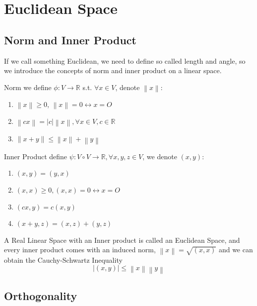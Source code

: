 \chapter{Euclidean Space}
\section{Norm and Inner Product}
If we call something Euclidean, we need to define so called length and angle, so we introduce the concepts of norm and inner product on a linear space.
\begin{definition}{Norm}
  we define $\phi:V \to \mathbb{R}$ s.t. $\forall x \in V$, denote $\left\| x \right\|$:
  \begin{enumerate}
    \item $\left\| x \right\| \geq 0$, $\left\| x \right\| = 0 \leftrightarrow x = O$ 
    \item $\left\| c x \right\| = |c|\left\| x \right\|,\forall x \in V, c \in \mathbb{R}$
    \item $\left\| x + y\right\| \leq \left\| x \right\| + \left\| y \right\|$
  \end{enumerate}
\end{definition}
\begin{definition}{Inner Product}
  define $\psi :V \circ V\to \mathbb{R}, \forall x, y,z \in V$, we denote $(x,y)$:
  \begin{enumerate}
    \item $(x,y)=(y,x)$
    \item $(x,x) \geq 0, (x,x) = 0 \leftrightarrow x = O$
    \item $(cx,y) = c(x,y)$
    \item $(x +y,z) = (x,z)+(y,z)$
  \end{enumerate}
\end{definition}
A Real Linear Space with an Inner product is called an Euclidean Space, and every inner product comes with an induced norm,
$\left\| x \right\| = \sqrt{(x,x)}$
and we can obtain the Cauchy-Schwartz Inequality
\[|(x,y)| \leq \left\| x \right\|\left\| y \right\|\]
\section{Orthogonality}


